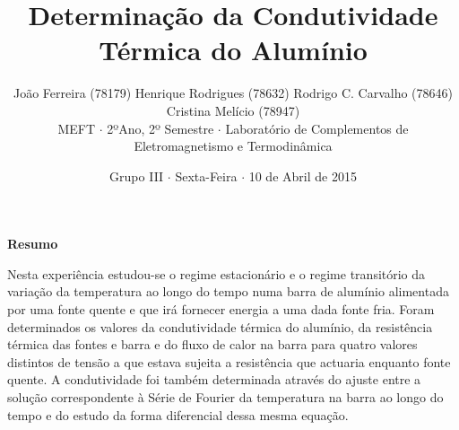 \documentclass[8pt]{extarticle}
\renewenvironment{abstract}
 {\small
  \begin{center}
  \bfseries \abstractname\vspace{-.5em}\vspace{0pt}
  \end{center}
  \list{}{
    \setlength{\leftmargin}{0cm}%
    \setlength{\rightmargin}{\leftmargin}%
  }%
  \item\relax}
 {\endlist}
\renewcommand{\abstractname}{Resumo}
\begin{document}
\title {\bf \huge Determinação da Condutividade Térmica do Alumínio}
\author
{{\small João Ferreira (78179) Henrique Rodrigues (78632) Rodrigo C. Carvalho (78646) Cristina Melício (78947)} \\
{\small MEFT $\cdot$ 2ºAno, 2º Semestre $\cdot$ Laboratório de Complementos de Eletromagnetismo e Termodinâmica}}
\date{{\small Grupo III $\cdot$ Sexta-Feira $\cdot$ 10 de Abril de 2015}}
\maketitle

\begin{abstract}
\par Nesta experiência estudou-se o regime estacionário e o regime transitório da variação da temperatura ao longo do tempo numa barra de alumínio alimentada por uma fonte quente e que irá fornecer energia a uma dada fonte fria. Foram determinados os valores da condutividade térmica do alumínio, da resistência térmica das fontes e barra e do fluxo de calor na barra para quatro valores distintos de tensão a que estava sujeita a resistência que actuaria enquanto fonte quente. A condutividade foi também determinada através do ajuste entre a solução correspondente à Série de Fourier da temperatura na barra ao longo do tempo e do estudo da forma diferencial dessa mesma equação.
\end{abstract}
\end{document}
